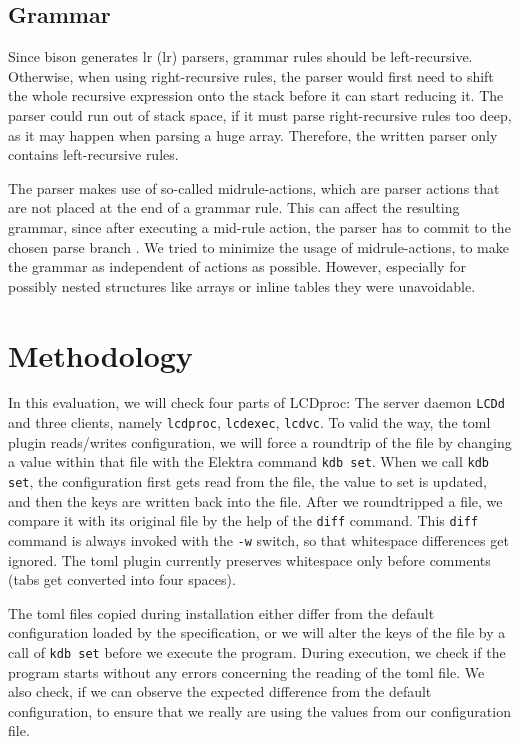 \documentclass[draft,final]{vutinfth} %
\begin{document}
\section{Grammar}
Since bison generates \acrshort{lr} (\acrlong{lr}) parsers, grammar rules should be left-recursive.
Otherwise, when using right-recursive rules, the parser would first need to shift the whole recursive expression onto the stack before it can start reducing it.
The parser could run out of stack space, if it must parse right-recursive rules too deep, as it may happen when parsing a huge array.
Therefore, the written parser only contains left-recursive rules.

The parser makes use of so-called midrule-actions, which are parser actions that are not placed at the end of a grammar rule.
This can affect the resulting grammar, since after executing a mid-rule action, the parser has to commit to the chosen parse branch \cite{bisonmidruleconflicts}.
We tried to minimize the usage of midrule-actions, to make the grammar as independent of actions as possible.
However, especially for possibly nested structures like arrays or inline tables they were unavoidable.

\chapter{Methodology}
In this evaluation, we will check four parts of LCDproc: The server daemon \texttt{LCDd} and three clients, namely \texttt{lcdproc}, \texttt{lcdexec}, \texttt{lcdvc}.
To valid the way, the \acrshort{toml} plugin reads/writes configuration, we will force a roundtrip of the file by changing a value within that file with the Elektra command \texttt{kdb set}.
When we call \texttt{kdb set}, the configuration first gets read from the file, the value to set is updated, and then the keys are written back into the file.
After we roundtripped a file, we compare it with its original file by the help of the \texttt{diff} command.
This \texttt{diff} command is always invoked with the \texttt{-w} switch, so that whitespace differences get ignored.
The \acrshort{toml} plugin currently preserves whitespace only before comments (tabs get converted into four spaces).

The \acrshort{toml} files copied during installation either differ from the default configuration loaded by the specification, or we will alter the keys of the file by a call of \texttt{kdb set} before we execute the program.
During execution, we check if the program starts without any errors concerning the reading of the \acrshort{toml} file.
We also check, if we can observe the expected difference from the default configuration, to ensure that we really are using the values from our configuration file.
\end{document}
